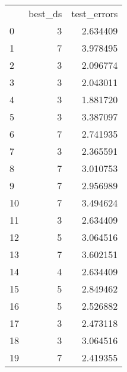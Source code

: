 \begin{tabular}{lrr}
 & best_ds & test_errors \\
0 & 3 & 2.634409 \\
1 & 7 & 3.978495 \\
2 & 3 & 2.096774 \\
3 & 3 & 2.043011 \\
4 & 3 & 1.881720 \\
5 & 3 & 3.387097 \\
6 & 7 & 2.741935 \\
7 & 3 & 2.365591 \\
8 & 7 & 3.010753 \\
9 & 7 & 2.956989 \\
10 & 7 & 3.494624 \\
11 & 3 & 2.634409 \\
12 & 5 & 3.064516 \\
13 & 7 & 3.602151 \\
14 & 4 & 2.634409 \\
15 & 5 & 2.849462 \\
16 & 5 & 2.526882 \\
17 & 3 & 2.473118 \\
18 & 3 & 3.064516 \\
19 & 7 & 2.419355 \\
\end{tabular}
